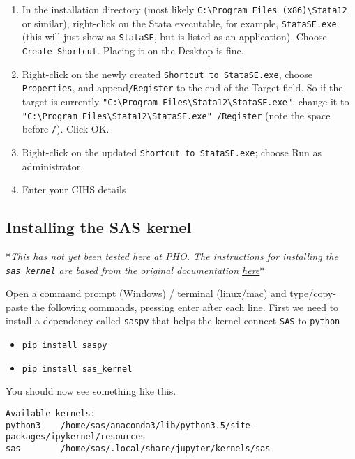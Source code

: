 \documentclass[]{book}
\providecommand{\tightlist}{%
  \setlength{\itemsep}{0pt}\setlength{\parskip}{0pt}}
\begin{document}
\begin{enumerate}
\def\labelenumi{\arabic{enumi}.}
\tightlist
\item
  In the installation directory (most likely \texttt{C:\textbackslash{}Program\ Files\ (x86)\textbackslash{}Stata12} or similar), right-click on the Stata executable, for example, \texttt{StataSE.exe} (this will just show as \texttt{StataSE}, but is listed as an application). Choose \texttt{Create\ Shortcut}. Placing it on the Desktop is fine.
\item
  Right-click on the newly created \texttt{Shortcut\ to\ StataSE.exe}, choose \texttt{Properties}, and append\texttt{/Register} to the end of the Target field. So if the target is currently \texttt{"C:\textbackslash{}Program\ Files\textbackslash{}Stata12\textbackslash{}StataSE.exe"}, change it to \texttt{"C:\textbackslash{}Program\ Files\textbackslash{}Stata12\textbackslash{}StataSE.exe"\ /Register} (note the space before \texttt{/}). Click OK.
\item
  Right-click on the updated \texttt{Shortcut\ to\ StataSE.exe}; choose Run as administrator.
\item
  Enter your CIHS details
\end{enumerate}

\hypertarget{installing-the-sas-kernel}{%
\subsection{Installing the SAS kernel}\label{installing-the-sas-kernel}}

*\emph{This has not yet been tested here at PHO. The instructions for installing the \texttt{sas\_kernel} are based from the original documentation \href{https://Github.com/sassoftware/sas_kernel}{here}}*

Open a command prompt (Windows) / terminal (linux/mac) and type/copy-paste the following commands, pressing enter after each line. First we need to install a dependency called \texttt{saspy} that helps the kernel connect \texttt{SAS} to \texttt{python}

\begin{itemize}
\tightlist
\item
  \texttt{pip\ install\ saspy}
\item
  \texttt{pip\ install\ sas\_kernel}
\end{itemize}

You should now see something like this.

\begin{verbatim}
Available kernels:
python3    /home/sas/anaconda3/lib/python3.5/site-packages/ipykernel/resources
sas        /home/sas/.local/share/jupyter/kernels/sas
\end{verbatim}
\end{document}
